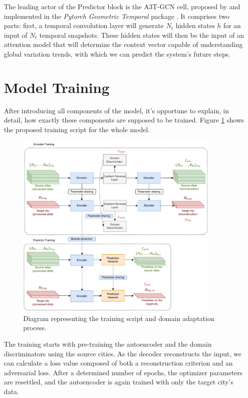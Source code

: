 The leading actor of the Predictor block is the \gls{A3T-GCN} cell, proposed by \cite{abs-2006-11583} and implemented in the \textit{Pytorch Geometric Temporal} package \cite{rozemberczki2021pytorch}. It comprises two parts: first, a temporal convolution layer will generate $N_{t}$ hidden states $h$ for an input of $N_{t}$ temporal snapshots. These hidden states will then be the input of an attention model that will determine the context vector capable of understanding global variation trends, with which we can predict the system's future steps.



\section{Model Training} \label{sec:training}

After introducing all components of the model, it's opportune to explain, in detail, how exactly these components are supposed to be trained. Figure \ref{fig:training_script} shows the proposed training script for the whole model.

\begin{figure}[!ht]
\noindent\hspace{0.5mm}\includegraphics[width=0.9\textwidth]{./figures/training_script.pdf}
\caption{Diagram representing the training script and domain adaptation process.}
\label{fig:training_script}
\end{figure}

The training starts with pre-training the autoencoder and the domain discriminators using the source cities. As the decoder reconstructs the input, we can calculate a loss value composed of both a reconstruction criterion and an adversarial loss. After a determined number of epochs, the optimizer parameters are resettled, and the autoencoder is again trained with only the target city's data.

